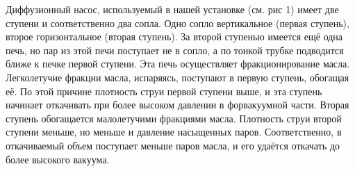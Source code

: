 \documentclass[a4paper, 12pt]{article}
\begin{document}
Диффузионный насос, используемый в нашей установке (см. рис 1) имеет две ступени и соответственно два сопла. Одно сопло вертикальное (первая ступень), второе горизонтальное (вторая ступень). За второй ступенью имеется ещё одна печь, но пар из этой печи поступает не в сопло, а по тонкой трубке подводится ближе к печке первой ступени. Эта печь осуществляет фракционирование масла. Легколетучие фракции масла, испаряясь, поступают в первую ступень, обогащая её. По этой причине плотность струи первой ступени выше, и эта ступень начинает откачивать при более высоком давлении в форвакуумной части. Вторая ступень обогащается малолетучими фракциями масла. Плотность струи второй ступени меньше, но меньше и давление насыщенных паров. Соответственно, в откачиваемый объем поступает меньше паров масла, и его удаётся откачать до более высокого вакуума.  \\
\end{document}
